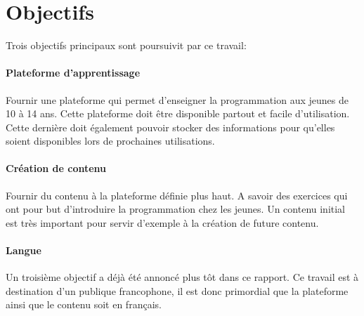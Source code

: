 \section{Objectifs}
\label{intro-objectifs}

Trois objectifs principaux sont poursuivit par ce travail:

\paragraph{Plateforme d'apprentissage} Fournir une plateforme qui permet d'enseigner la programmation aux jeunes de 10 à 14 ans. Cette plateforme doit être disponible partout et facile d'utilisation. Cette dernière doit également pouvoir stocker des informations pour qu'elles soient disponibles lors de prochaines utilisations.

\paragraph{Création de contenu} Fournir du contenu à la plateforme définie plus haut. A savoir des exercices qui ont pour but d'introduire la programmation chez les jeunes. Un contenu initial est très important pour servir d'exemple à la création de future contenu.

\paragraph{Langue} Un troisième objectif a déjà été annoncé plus tôt dans ce rapport. Ce travail est à destination d'un publique francophone, il est donc primordial que la plateforme ainsi que le contenu soit en français.
